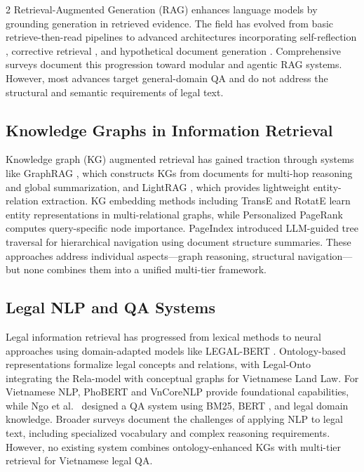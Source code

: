\documentclass[11pt,a4paper]{article}
\begin{document}
\begin{multicols}{2}
Retrieval-Augmented Generation (RAG) \cite{ref2} enhances language models by grounding generation in retrieved evidence. The field has evolved from basic retrieve-then-read pipelines \cite{ref3} to advanced architectures incorporating self-reflection \cite{ref_selfrag}, corrective retrieval \cite{ref_crag}, and hypothetical document generation \cite{ref_hyde}. Comprehensive surveys \cite{ref_gao2024,ref_fan2024} document this progression toward modular and agentic RAG systems. However, most advances target general-domain QA and do not address the structural and semantic requirements of legal text.

\subsection{Knowledge Graphs in Information Retrieval}

Knowledge graph (KG) augmented retrieval has gained traction through systems like GraphRAG \cite{ref4}, which constructs KGs from documents for multi-hop reasoning and global summarization, and LightRAG \cite{ref5}, which provides lightweight entity-relation extraction. KG embedding methods including TransE \cite{ref_transe} and RotatE \cite{ref_rotateE} learn entity representations in multi-relational graphs, while Personalized PageRank \cite{ref12,ref_jeh2003} computes query-specific node importance. PageIndex \cite{ref14} introduced LLM-guided tree traversal for hierarchical navigation using document structure summaries. These approaches address individual aspects---graph reasoning, structural navigation---but none combines them into a unified multi-tier framework.

\subsection{Legal NLP and QA Systems}

Legal information retrieval has progressed from lexical methods \cite{ref1,ref11} to neural approaches using domain-adapted models like LEGAL-BERT \cite{ref_chalkidis}. Ontology-based representations \cite{ref8} formalize legal concepts and relations, with Legal-Onto \cite{ref6} integrating the Rela-model \cite{ref10} with conceptual graphs for Vietnamese Land Law. For Vietnamese NLP, PhoBERT \cite{ref_phobert} and VnCoreNLP \cite{ref_vncorenlp} provide foundational capabilities, while Ngo et al.~\cite{ref7} designed a QA system using BM25, BERT \cite{ref13}, and legal domain knowledge. Broader surveys \cite{ref_zhong2020,ref_legalai2024} document the challenges of applying NLP to legal text, including specialized vocabulary and complex reasoning requirements. However, no existing system combines ontology-enhanced KGs with multi-tier retrieval for Vietnamese legal QA.


\end{multicols}
\end{document}
